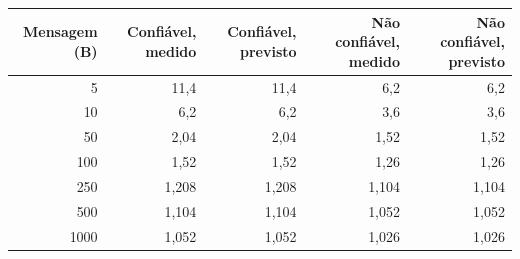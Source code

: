 \begin{tabular}{rrrrr}
\toprule
Mensagem (B) & Confi\'avel, medido & Confi\'avel, previsto & N\~ao confi\'avel, medido & N\~ao confi\'avel, previsto \\
\midrule
5 & 11,4 & 11,4 & 6,2 & 6,2 \\
10 & 6,2 & 6,2 & 3,6 & 3,6 \\
50 & 2,04 & 2,04 & 1,52 & 1,52 \\
100 & 1,52 & 1,52 & 1,26 & 1,26 \\
250 & 1,208 & 1,208 & 1,104 & 1,104 \\
500 & 1,104 & 1,104 & 1,052 & 1,052 \\
1000 & 1,052 & 1,052 & 1,026 & 1,026 \\
\bottomrule
\end{tabular}
